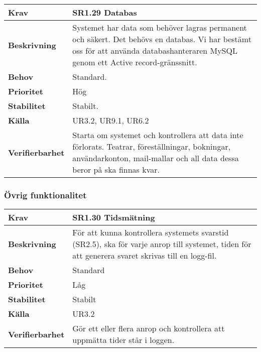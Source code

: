 \documentclass[a4paper, twoside, 11pt, titlepage]{article}
\begin{document}
		\begin {table} [ht] \begin{tabular} { p{2.6cm} p{12.5cm} }
			\hline
			\sffamily\textbf{Krav} & \sffamily\textbf{SR1.29 Databas } \\
			\hline
			\sffamily\textbf{Beskrivning} & Systemet har data som behöver lagras permanent och säkert. Det behövs en databas. Vi har bestämt oss för att använda databashanteraren MySQL genom ett Active record-gränssnitt.  \\
			\hline
			\sffamily\textbf{Behov} & Standard.  \\
			\hline
			\sffamily\textbf{Prioritet} & Hög  \\
			\hline
			\sffamily\textbf{Stabilitet} & Stabilt.  \\
			\hline
			\sffamily\textbf{Källa} & UR3.2, UR9.1, UR6.2  \\
			\hline
			\sffamily\textbf{Verifierbarhet} & Starta om systemet och kontrollera att data inte förlorats. Teatrar, föreställningar, bokningar, användarkonton, mail-mallar och all data dessa beror på ska finnas kvar.  \\
			\hline
		\end{tabular} \end{table} \FloatBarrier


		\subsubsection{Övrig funktionalitet}


		\begin {table} [ht] \begin{tabular} { p{2.6cm} p{12.5cm} }
			\hline
			\sffamily\textbf{Krav} & \sffamily\textbf{SR1.30 Tidsmätning } \\
			\hline
			\sffamily\textbf{Beskrivning} & För att kunna kontrollera systemets svarstid (SR2.5), ska för varje anrop till systemet, tiden för att generera svaret skrivas till en logg-fil.  \\
			\hline
			\sffamily\textbf{Behov} & Standard  \\
			\hline
			\sffamily\textbf{Prioritet} & Låg  \\
			\hline
			\sffamily\textbf{Stabilitet} & Stabilt  \\
			\hline
			\sffamily\textbf{Källa} & UR3.2  \\
			\hline
			\sffamily\textbf{Verifierbarhet} & Gör ett eller flera anrop och kontrollera att uppmätta tider står i loggen.  \\
			\hline
		\end{tabular} \end{table} \FloatBarrier
\end{document}
